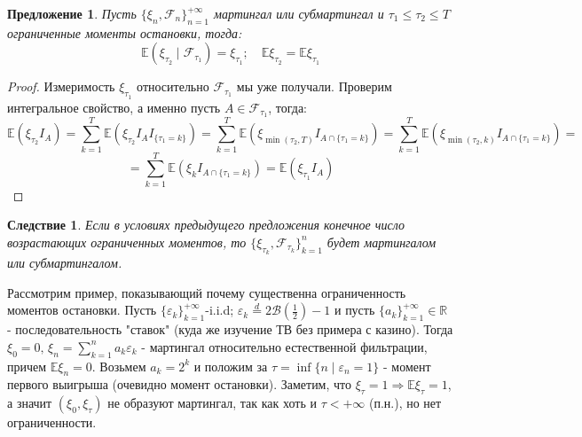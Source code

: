 \documentclass[12pt,a4paper]{article} %
\newtheorem{proposition}{Предложение}
\newtheorem{consequence}{Следствие}
\newcommand{\R}{\mathbb{R}}
\newcommand{\E}{\mathbb{E}}
\newcommand{\F}{\mathcal{F}}
\begin{document}
	\begin{proposition}
		Пусть $\{\xi_n,\F_n\}_{n=1}^{+\infty}$ мартингал или субмартингал и $\tau_1\leq\tau_2\leq T$ ограниченные моменты остановки, тогда:
		$$\E(\xi_{\tau_2}\mid\F_{\tau_1})=\xi_{\tau_1};\quad\E\xi_{\tau_2}=\E\xi_{\tau_1}$$
	\end{proposition}
	\begin{proof}
		Измеримость $\xi_{\tau_1}$ относительно $\F_{\tau_1}$ мы уже получали. Проверим интегральное свойство, а именно пусть $A\in\F_{\tau_1}$, тогда:
		$$\E(\xi_{\tau_2}I_A)=\sum_{k=1}^T\E(\xi_{\tau_2}I_AI_{\{\tau_1=k\}})=\sum_{k=1}^T\E(\xi_{\min(\tau_2,T)}I_{A\cap{\{\tau_1=k\}}})=\sum_{k=1}^T\E(\xi_{\min(\tau_2,k)}I_{A\cap{\{\tau_1=k\}}})=$$
		$$=\sum_{k=1}^T\E(\xi_kI_{A\cap{\{\tau_1=k\}}})=\E(\xi_{\tau_1}I_A)$$
	\end{proof}
	\begin{consequence}
		Если в условиях предыдущего предложения конечное число возрастающих ограниченных моментов, то $\{\xi_{\tau_k},\F_{\tau_k}\}_{k=1}^n$ будет мартингалом или субмартингалом.
	\end{consequence}
	Рассмотрим пример, показывающий почему существенна ограниченность моментов остановки. Пусть $\{\varepsilon_k\}_{k=1}^{+\infty}$-i.i.d; $\varepsilon_k\overset{d}{=}2\mathcal{B}(\frac{1}{2})-1$ и пусть $\{a_k\}_{k=1}^{+\infty}\in\R$ - последовательность "ставок" (куда же изучение ТВ без примера с казино). Тогда $\xi_0=0,\,\xi_n=\displaystyle\sum_{k=1}^na_k\varepsilon_k$ - мартингал относительно естественной фильтрации, причем $\E\xi_n=0$. Возьмем $a_k=2^k$ и положим за $\tau=\inf\{n\mid\varepsilon_n=1\}$ - момент первого выигрыша (очевидно момент остановки). Заметим, что $\xi_{\tau}=1\Rightarrow\E\xi_{\tau}=1$, а значит $(\xi_0, \xi_{\tau})$ не образуют мартингал, так как хоть и $\tau<+\infty$ (п.н.), но нет ограниченности.
\end{document}
